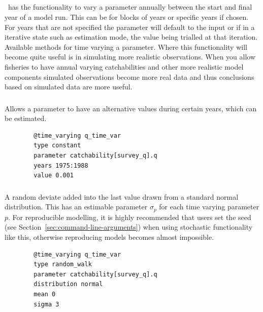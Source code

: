 %
%
\subsection{\label{sec:time_var}}

\CNAME\ has the functionality to vary a parameter annually between the start and final year of a model run. This can be for blocks of years or specific years if chosen. For years that are not specified the parameter will default to the input or if in a iterative state such as estimation mode, the value being trialled at that iteration. Available methods for time varying a parameter. Where this functionality will become quite useful is in simulating more realistic observations. When you allow fisheries to have annual varying catchabilities and other more realistic model components simulated observations become more real data and thus conclusions based on simulated data are more useful.

\subsubsection[Constant]{}
Allows a parameter to have an alternative values during certain years, which can be estimated.
{\small{\begin{verbatim}
		@time_varying q_time_var
		type constant
		parameter catchability[survey_q].q
		years 1975:1988
		value 0.001
		\end{verbatim}}}

\subsubsection[Random Walk]{}

A random deviate added into the last value drawn from a standard normal distribution. This has an estimable parameter $\sigma_p$ for each time varying parameter $p$. For reproducible modelling, it is highly recommended that users set the seed (see Section~\ref{sec:command-line-arguments}) when using stochastic functionality like this, otherwise reproducing models becomes almost impossible.
{\small{\begin{verbatim}
		@time_varying q_time_var
		type random_walk
		parameter catchability[survey_q].q
		distribution normal
		mean 0
		sigma 3
		\end{verbatim}}}

